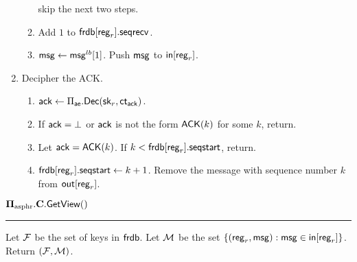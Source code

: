 \begin{definition}
\begin{enumerate}
\begin{enumerate}
        skip the next two steps.
        \item Add $1$ to $\mathsf{frdb}[\mathsf{reg}_r].\mathsf{seqrecv}$. 
        \item $\mathsf{msg} \leftarrow \mathsf{msg}^{lb}[1]$. Push $\mathsf{msg}$ to $\mathsf{in}[\mathsf{reg}_r]$.
    \end{enumerate}
    \item Decipher the ACK.
    \begin{enumerate}
        \item $\mathsf{ack} \leftarrow \Pi_{\mathsf{ae}}.\mathsf{Dec}({\mathsf{sk}}_{r}, \mathsf{ct}_{\mathsf{ack}})$.
        \item If $\mathsf{ack} = \bot$ or $\mathsf{ack}$ is not the form $\mathsf{ACK}(k)$ for some $k$, return.
        \item Let $\mathsf{ack} = \mathsf{ACK}(k)$. If $k < \mathsf{frdb}[\mathsf{reg}_r].\mathsf{seqstart}$, return.
        \item $\mathsf{frdb}[\mathsf{reg}_r].\mathsf{seqstart} \leftarrow k + 1$. Remove the message with sequence number $k$ from $\mathsf{out}[\mathsf{reg}_r]$.
    \end{enumerate}
\end{enumerate}
\vspace{10pt}
$\mathbf{\Pi_{\text{asphr}}.C.\mathsf{GetView}}()$
\vspace{5pt}
\hrule
\vspace{5pt}
Let $\mathcal{F}$ be the set of keys in $\mathsf{frdb}$. Let $\mathcal{M}$ be the set $\{(\mathsf{reg}_r, \mathsf{msg}): \mathsf{msg} \in \mathsf{in}[\mathsf{reg}_r]\}$. Return $(\mathcal{F}, \mathcal{M})$.

\end{definition}